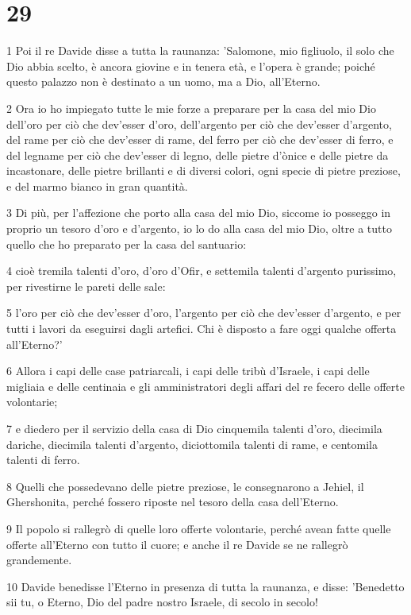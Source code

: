 \chapter{29}

\par 1 Poi il re Davide disse a tutta la raunanza: 'Salomone, mio figliuolo, il solo che Dio abbia scelto, è ancora giovine e in tenera età, e l'opera è grande; poiché questo palazzo non è destinato a un uomo, ma a Dio, all'Eterno.
\par 2 Ora io ho impiegato tutte le mie forze a preparare per la casa del mio Dio dell'oro per ciò che dev'esser d'oro, dell'argento per ciò che dev'esser d'argento, del rame per ciò che dev'esser di rame, del ferro per ciò che dev'esser di ferro, e del legname per ciò che dev'esser di legno, delle pietre d'ònice e delle pietre da incastonare, delle pietre brillanti e di diversi colori, ogni specie di pietre preziose, e del marmo bianco in gran quantità.
\par 3 Di più, per l'affezione che porto alla casa del mio Dio, siccome io posseggo in proprio un tesoro d'oro e d'argento, io lo do alla casa del mio Dio, oltre a tutto quello che ho preparato per la casa del santuario:
\par 4 cioè tremila talenti d'oro, d'oro d'Ofir, e settemila talenti d'argento purissimo, per rivestirne le pareti delle sale:
\par 5 l'oro per ciò che dev'esser d'oro, l'argento per ciò che dev'esser d'argento, e per tutti i lavori da eseguirsi dagli artefici. Chi è disposto a fare oggi qualche offerta all'Eterno?'
\par 6 Allora i capi delle case patriarcali, i capi delle tribù d'Israele, i capi delle migliaia e delle centinaia e gli amministratori degli affari del re fecero delle offerte volontarie;
\par 7 e diedero per il servizio della casa di Dio cinquemila talenti d'oro, diecimila dariche, diecimila talenti d'argento, diciottomila talenti di rame, e centomila talenti di ferro.
\par 8 Quelli che possedevano delle pietre preziose, le consegnarono a Jehiel, il Ghershonita, perché fossero riposte nel tesoro della casa dell'Eterno.
\par 9 Il popolo si rallegrò di quelle loro offerte volontarie, perché avean fatte quelle offerte all'Eterno con tutto il cuore; e anche il re Davide se ne rallegrò grandemente.
\par 10 Davide benedisse l'Eterno in presenza di tutta la raunanza, e disse: 'Benedetto sii tu, o Eterno, Dio del padre nostro Israele, di secolo in secolo!
